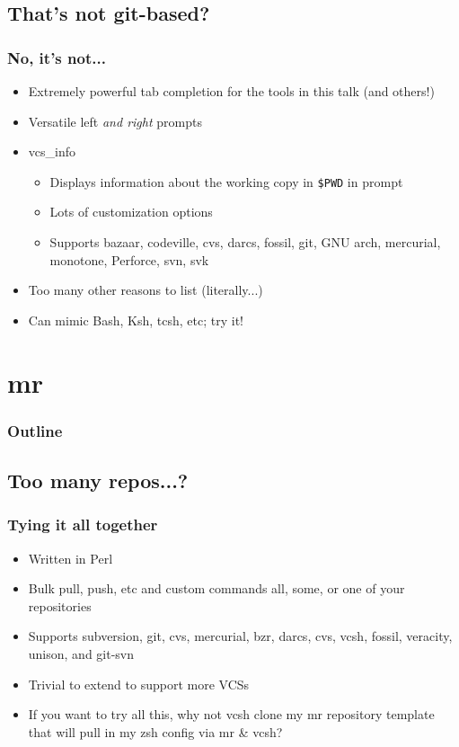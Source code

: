 \documentclass[t]{beamer}
\begin{document}
\subsection{That's not git-based?}


\begin{frame}
	\frametitle{No, it's not...}
	\begin{itemize}
		\item Extremely powerful tab completion for the tools in this talk (and others!)
		\item Versatile left \emph{and right} prompts
		\item vcs\_info
		\begin{itemize}
			\item Displays information about the working copy in \texttt{\$PWD} in prompt
			\item Lots of customization options
			\item Supports bazaar, codeville, cvs, darcs, fossil, git, GNU arch, mercurial, monotone, Perforce, svn, svk
		\end{itemize}
		\item Too many other reasons to list (literally...)
		\item Can mimic Bash, Ksh, tcsh, etc; try it!
	\end{itemize}
\end{frame}


\section{mr}

\begin{frame}
	\frametitle{Outline}
	\tableofcontents[currentsection]
\end{frame}

\subsection{Too many repos...?}

\begin{frame}
	\frametitle{Tying it all together}
	\begin{itemize}
		\item Written in Perl
		\item Bulk pull, push, etc and custom commands all, some, or one of your repositories
		\item Supports subversion, git, cvs, mercurial, bzr, darcs, cvs, vcsh, fossil, veracity, unison, and git-svn
		\item Trivial to extend to support more VCSs
		\item If you want to try all this, why not vcsh clone my mr repository template that will pull in my zsh config via mr \& vcsh?
	\end{itemize}
\end{frame}
\end{document}
